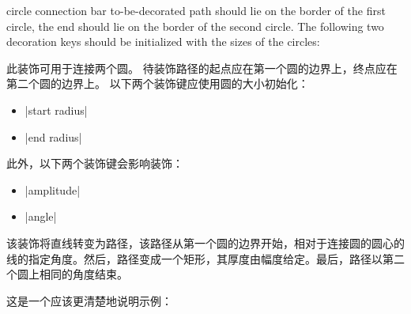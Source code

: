 \begin{decoration}{circle connection bar}
    to-be-decorated path should lie on the border of the first circle, the end should lie on the border of the second circle. The following two decoration keys should be initialized with the sizes of the circles:

    此装饰可用于连接两个圆。 待装饰路径的起点应在第一个圆的边界上，终点应在第二个圆的边界上。 以下两个装饰键应使用圆的大小初始化：
    \begin{itemize}
        \item |start radius|
        \item |end radius|
    \end{itemize}
    此外，以下两个装饰键会影响装饰：
    \begin{itemize}
        \item |amplitude|
        \item |angle|
    \end{itemize}

    该装饰将直线转变为路径，该路径从第一个圆的边界开始，相对于连接圆的圆心的线的指定角度。然后，路径变成一个矩形，其厚度由幅度给定。最后，路径以第二个圆上相同的角度结束。


    这是一个应该更清楚地说明示例：
\begin{codeexample}[preamble={\usetikzlibrary{mindmap}}]
\end{codeexample}



\end{decoration}
